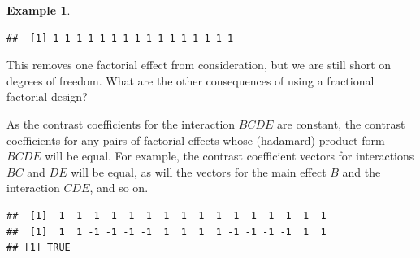 \documentclass[
]{book}
\newenvironment{Shaded}{\begin{snugshade}}{\end{snugshade}}
\newcommand{\FunctionTok}[1]{\textcolor[rgb]{0.00,0.00,0.00}{#1}}
\newcommand{\NormalTok}[1]{#1}
\newcommand{\OtherTok}[1]{\textcolor[rgb]{0.56,0.35,0.01}{#1}}
\newcommand{\SpecialCharTok}[1]{\textcolor[rgb]{0.00,0.00,0.00}{#1}}
\theoremstyle{definition}
\theoremstyle{definition}
\newtheorem{example}{Example}[chapter]
\theoremstyle{definition}
\theoremstyle{definition}
\theoremstyle{remark}
\begin{document}
\begin{example}
\begin{verbatim}
##  [1] 1 1 1 1 1 1 1 1 1 1 1 1 1 1 1 1
\end{verbatim}

This removes one factorial effect from consideration, but we are still short on degrees of freedom. What are the other consequences of using a fractional factorial design?

As the contrast coefficients for the interaction \(BCDE\) are constant, the contrast coefficients for any pairs of factorial effects whose (hadamard) product form \(BCDE\) will be equal. For example, the contrast coefficient vectors for interactions \(BC\) and \(DE\) will be equal, as will the vectors for the main effect \(B\) and the interaction \(CDE\), and so on.

\begin{Shaded}
\end{Shaded}

\begin{verbatim}
##  [1]  1  1 -1 -1 -1 -1  1  1  1  1 -1 -1 -1 -1  1  1
##  [1]  1  1 -1 -1 -1 -1  1  1  1  1 -1 -1 -1 -1  1  1
## [1] TRUE
\end{verbatim}

\begin{Shaded}
\end{Shaded}


\end{example}
\end{document}
